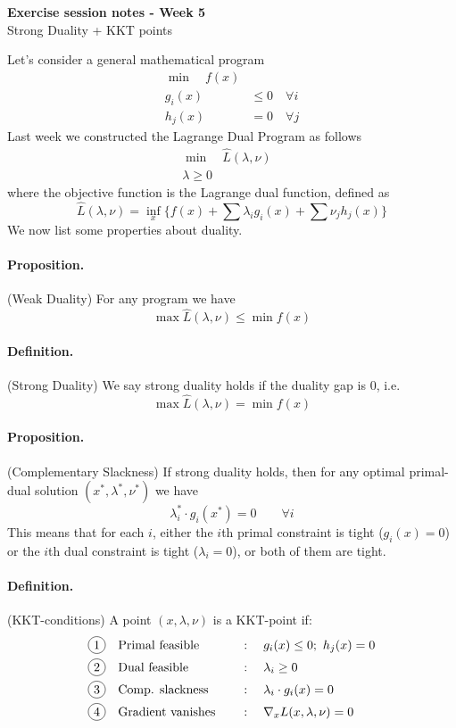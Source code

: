 \documentclass[answers]{exam}
\begin{document}
	$ $
	\begin{center}
		\huge \textbf{Exercise session notes - Week 5}  \\ \vspace*{3mm}
        \Large{Strong Duality + KKT points}
	\end{center}
	$ $\\

    \noindent Let's consider a general mathematical program
    \begin{align*}
        \min \quad f(x) & \\ 
        g_i(x) &\leq 0 \quad\forall i\\
        h_j(x) &= 0 \quad\forall j
    \end{align*}
    Last week we constructed the Lagrange Dual Program as follows 
    \begin{align*}
        \min \quad \hat{L}(\lambda, \nu)& \\ 
        \lambda \geq 0
    \end{align*}
    where the objective function is the Lagrange dual function, defined as 
    $$ \hat{L}(\lambda, \nu) = \inf_x\Big\{ f(x) + \sum \lambda_i g_i(x) + \sum \nu_j h_j(x)\Big\} $$
    We now list some properties about duality. \\
    \paragraph{Proposition.} (Weak Duality) For any program we have 
    $$\max \hat{L}(\lambda, \nu) \leq \min f(x)$$
    \paragraph{Definition.} (Strong Duality) We say strong duality holds if the duality gap is $0$, i.e.  
    $$\max \hat{L}(\lambda, \nu) = \min f(x)$$
    \paragraph{Proposition.} (Complementary Slackness) If strong duality holds, then for any optimal primal-dual solution $(x^*, \lambda^*, \nu^*)$ we have 
    $$\lambda_i^* \cdot g_i(x^*) = 0\quad\quad \forall i $$
    This means that for each $i$, either the $i$th primal constraint is tight ($g_i(x) = 0$) or the $i$th dual constraint is tight ($\lambda_i = 0$), or both of them are tight. 
    \paragraph{Definition.} (KKT-conditions) A point $(x,\lambda, \nu)$ is a KKT-point if:
    \begin{alignat*}{3}
        \circled{1}\quad &\text{Primal feasible}\quad &&:\quad g_i(x)\leq 0;\ h_j(x) = 0 \\ 
        \circled{2}\quad &\text{Dual feasible}\quad &&: \quad \lambda_i\geq 0 \\
        \circled{3}\quad &\text{Comp. slackness}\quad &&: \quad \lambda_i\cdot g_i(x) = 0 \\ 
        \circled{4}\quad &\text{Gradient vanishes}\quad &&:\quad \nabla_x L(x,\lambda, \nu) = 0
    \end{alignat*}
\end{document}
